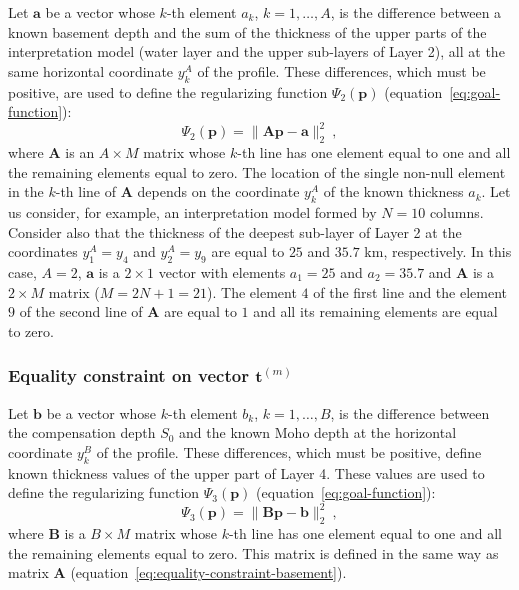 \documentclass[manuscript]{geophysics}
\begin{document}
Let $\mathbf{a}$ be a vector whose $k$-th element $a_{k}$,
$k = 1, \dots, A$, is the difference between a known basement depth and
the sum of the thickness of the upper parts of the interpretation model
(water layer and the upper sub-layers of Layer 2), all at the same
horizontal coordinate $y^{A}_{k}$ of the profile. 
These differences, which must be positive, are used to define 
the regularizing function $\Psi_{2}(\mathbf{p})$ 
(equation~\ref{eq:goal-function}):
\begin{equation}
\Psi_{2}(\mathbf{p}) = \| \mathbf{A}\mathbf{p} - \mathbf{a} \|_{2}^{2} \: ,
\label{eq:equality-constraint-basement}
\end{equation}
where $\mathbf{A}$ is an $A \times M$ matrix whose $k$-th line has one element 
equal to one and all the remaining elements equal to zero. The location of the
single non-null element in the $k$-th line of $\mathbf{A}$ depends on the coordinate
$y^{A}_{k}$ of the known thickness $a_{k}$. Let us consider, 
for example, an interpretation model formed by $N = 10$ columns. Consider also that 
the thickness of the deepest sub-layer of Layer 2  
at the coordinates $y^{A}_{1} = y_{4}$ and $y^{A}_{2} = y_{9}$ 
are equal to $25$ and $35.7$ km, respectively. In this case, $A = 2$,
$\mathbf{a}$ is a $2 \times 1$ vector with elements $a_{1} = 25$ and $a_{2} = 35.7$
and $\mathbf{A}$ is a $2 \times M$ matrix ($M = 2N + 1 = 21$). The element $4$ of the
first line and the element $9$ of the second line of $\mathbf{A}$ are equal to $1$ and
all its remaining elements are equal to zero.

\subsubsection*{Equality constraint on vector $\mathbf{t}^{(m)}$}

Let $\mathbf{b}$ be a vector whose $k$-th element $b_{k}$,
$k = 1, \dots, B$, is the difference between the compensation depth
$S_{0}$ and the known Moho depth at the horizontal coordinate $y^{B}_{k}$ of the
profile. These differences, which must be positive, define known thickness values
of the upper part of Layer 4. These values are used to define the 
regularizing function $\Psi_{3}(\mathbf{p})$ (equation~\ref{eq:goal-function}):
\begin{equation}
\Psi_{3}(\mathbf{p}) = \| \mathbf{B}\mathbf{p} - \mathbf{b} \|_{2}^{2} \: ,
\label{eq:equality-constraint-moho}
\end{equation}
where $\mathbf{B}$ is a $B \times M$ matrix whose $k$-th line has one element 
equal to one and all the remaining elements equal to zero. This matrix is defined 
in the same way as matrix $\mathbf{A}$ (equation~\ref{eq:equality-constraint-basement}).
\end{document}
